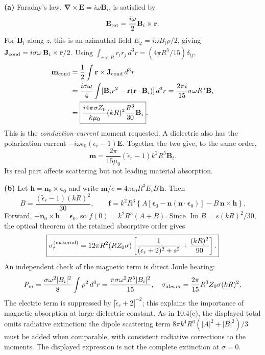 \textbf{(a)} Faraday's law, $\boldsymbol\nabla\times\mathbf E=i\omega
\mathbf B_i$, is satisfied by
\[
\mathbf E_{\rm rot}=\frac{i\omega}{2}\mathbf B_i\times\mathbf r .
\]
For $\mathbf B_i$ along $z$, this is an azimuthal field
$E_\varphi=i\omega B_i\rho/2$, giving
$\mathbf J_{\rm cond}=i\sigma\omega\,\mathbf B_i\times\mathbf r/2$.
Using $\int_{r<R}r_i r_j\,d^3r=(4\pi R^5/15)\delta_{ij}$,
\[
\begin{split}
\mathbf m_{\rm cond}
&=\frac12\int\mathbf r\times\mathbf J_{\rm cond}\,d^3r\\
&=\frac{i\sigma\omega}{4}\int
[\mathbf B_i r^2-\mathbf r(\mathbf r\cdot\mathbf B_i)]\,d^3r
=\frac{2\pi i}{15}\sigma\omega R^5\mathbf B_i\\
&=\boxed{\frac{i4\pi\sigma Z_0}{k\mu_0}
(kR)^2\frac{R^3}{30}\mathbf B_i}.
\end{split}
\]
This is the \emph{conduction-current} moment requested. A dielectric also
has the polarization current $-i\omega\epsilon_0(\epsilon_r-1)\mathbf E$.
Together the two give, to the same order,
\[
\mathbf m=\frac{2\pi}{15\mu_0}
(\widetilde\epsilon_r-1)k^2R^5\mathbf B_i.
\]
Its real part affects scattering but not leading material absorption.

\textbf{(b)} Let $\mathbf h=\mathbf n_0\times\boldsymbol\epsilon_0$ and write
$\mathbf m/c=4\pi\epsilon_0R^3 E_i B\,\mathbf h$.
Then
\[
B=\frac{(\widetilde\epsilon_r-1)(kR)^2}{30},
\qquad
\mathbf f=k^2R^3\left\{
A[\boldsymbol\epsilon_0-\mathbf n(\mathbf n\cdot\boldsymbol\epsilon_0)]
-B\,\mathbf n\times\mathbf h\right\}.
\]
Forward, $-\mathbf n_0\times\mathbf h=\boldsymbol\epsilon_0$,
so $f(0)=k^2R^3(A+B)$.
Since $\operatorname{Im}B=s(kR)^2/30$, the optical theorem at the
retained absorptive order gives
\[
\boxed{\sigma_t^{(\rm material)}
=12\pi R^2(RZ_0\sigma)
\left[\frac1{(\epsilon_r+2)^2+s^2}
+\frac{(kR)^2}{90}\right].}
\]
An independent check of the magnetic term is direct Joule heating:
\[
P_m=\frac{\sigma\omega^2|B_i|^2}{8}
\int\rho^2\,d^3r
=\frac{\pi\sigma\omega^2R^5|B_i|^2}{15},
\quad
\sigma_{{\rm abs},m}=\frac{2\pi}{15}R^3Z_0\sigma(kR)^2.
\]
The electric term is suppressed by $|\widetilde\epsilon_r+2|^{-2}$;
this explains the importance of magnetic absorption at large dielectric
constant. As in 10.4(c), the displayed total omits radiative extinction:
the dipole scattering term $8\pi k^4R^6(|A|^2+|B|^2)/3$ must be added
when comparable, with consistent radiative corrections to the moments.
The displayed expression is not the complete extinction at $\sigma=0$.


